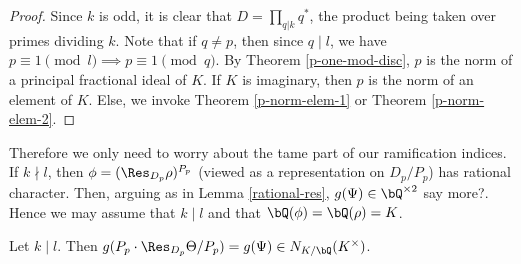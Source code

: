 \begin{proof}
    Since $k$ is odd, it is clear that $D = \prod_{q | k} q^*$, the product being taken over primes dividing $k$. Note that if $q \not= p$, then since $q \mid l$, we have $p \equiv 1 \pmod l \implies p \equiv 1 \pmod q$. By Theorem \ref{p-one-mod-disc},  $p$ is the norm of a principal fractional ideal of $K$. If $K$ is imaginary, then $p$ is the norm of an element of $K$. Else, we invoke Theorem \ref{p-norm-elem-1} or Theorem \ref{p-norm-elem-2}.
\end{proof}

Therefore we only need to worry about the tame part of our ramification indices. If $k \nmid l$, then $\phi = (\Res_{D_p} \rho)^{P_p}$ (viewed as a representation on $D_p / P_p$) has rational character. Then, arguing as in Lemma \ref{rational-res}, $g(\Psi) \in \bQ^{\times 2}$ {\color{red} say more?}.
Hence we may assume that $k \mid l$ and that $\bQ(\phi) = \bQ(\rho) = K$.

\begin{prop}\label{semi-stable-gd}
    Let $k \mid l$. Then $g(P_p \cdot \Res_{D_p}\Theta / P_p) = g(\Psi) \in N_{K / \bQ}(K^{\times})$.   
\end{prop}

